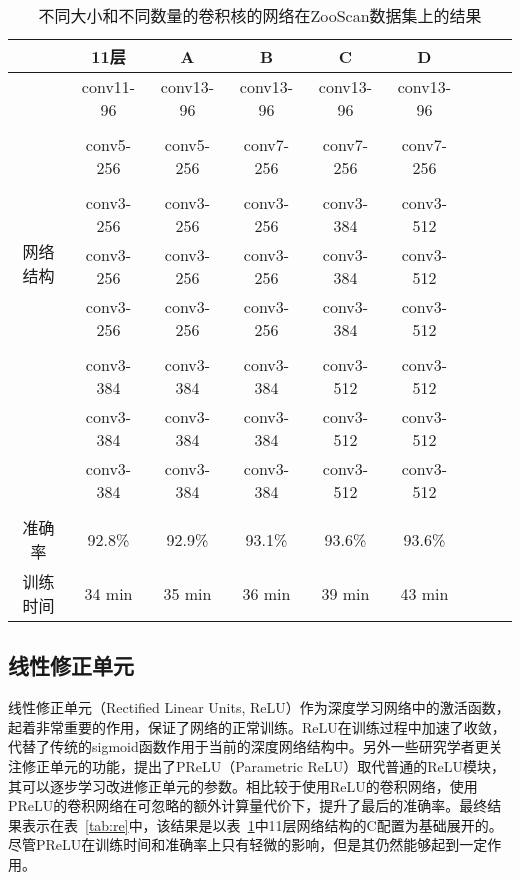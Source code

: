 \begin{table}[H]
\centering
\caption{不同大小和不同数量的卷积核的网络在ZooScan数据集上的结果}
\label{tab:width}
\begin{tabular}{|c|c|c|c|c|c|c|c|c|}
\hline  & 11层 & A & B & C & D \\ 
\hline \multirow{10}{*}{网络结构}& conv11-96 & conv13-96 & conv13-96 & conv13-96 & conv13-96 \\
	& & & & &  \\
	\cline{2-6} & conv5-256 & conv5-256 & conv7-256 & conv7-256 & conv7-256 \\
	& & & & & \\
	\cline{2-6} & conv3-256 & conv3-256 & conv3-256 & conv3-384 & conv3-512 \\
        & conv3-256 & conv3-256 & conv3-256 & conv3-384 & conv3-512 \\
        & conv3-256 & conv3-256 & conv3-256 & conv3-384 & conv3-512 \\
	& & & & & \\
	\cline{2-6} & conv3-384 & conv3-384 & conv3-384 & conv3-512 & conv3-512 \\
	& conv3-384 & conv3-384 & conv3-384 & conv3-512 & conv3-512 \\
	& conv3-384 & conv3-384 & conv3-384 & conv3-512 & conv3-512 \\
	& & & & & \\
\hline 准确率 & 92.8\% & 92.9\% & 93.1\% & 93.6\% & 93.6\% \\
\hline 训练时间 & 34 min & 35 min & 36 min & 39 min & 43 min \\
\hline 
\end{tabular}
\end{table}

\subsection{线性修正单元}
线性修正单元（Rectified Linear Units, ReLU）作为深度学习网络中的激活函数，起着非常重要的作用，保证了网络的正常训练。ReLU在训练过程中加速了收敛，代替了传统的sigmoid函数作用于当前的深度网络结构中。另外一些研究学者更关注修正单元的功能，提出了PReLU（Parametric ReLU）取代普通的ReLU模块，其可以逐步学习改进修正单元的参数。相比较于使用ReLU的卷积网络，使用PReLU的卷积网络在可忽略的额外计算量代价下，提升了最后的准确率。最终结果表示在表~\ref{tab:re}中，该结果是以表~\ref{tab:width}中11层网络结构的C配置为基础展开的。尽管PReLU在训练时间和准确率上只有轻微的影响，但是其仍然能够起到一定作用。

